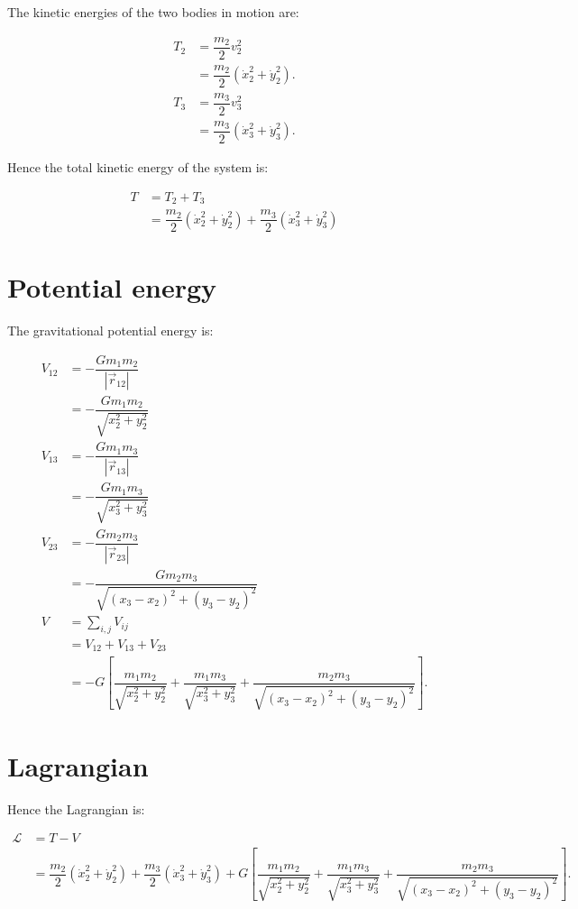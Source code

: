 \documentclass[12pt,a4paper,portrait]{article}
\begin{document}
	The kinetic energies of the two bodies in motion are:
	
	\begin{align*}
		T_2 &= \dfrac{m_2}{2} v_2^2 \\
		&= \dfrac{m_2}{2} \left(\dot{x}_2^2 + \dot{y}_2^2\right). \\
		T_3 &= \dfrac{m_3}{2}v_3^2 \\
		&= \dfrac{m_3}{2} \left(\dot{x}_3^2 + \dot{y}_3^2\right).
	\end{align*}
	
	Hence the total kinetic energy of the system is:
	
	\begin{align*}
		T &= T_2 + T_3 \\
		&= \dfrac{m_2}{2} \left(\dot{x}_2^2 + \dot{y}_2^2\right) + \dfrac{m_3}{2} \left(\dot{x}_3^2 + \dot{y}_3^2\right)
	\end{align*}
	
	\section{Potential energy}
	The gravitational potential energy is:
	
	\begin{align*}
		V_{12} &= -\dfrac{Gm_1m_2}{|\vec{r}_{12}|} \\
		&= -\dfrac{Gm_1m_2}{\sqrt{x_2^2+y_2^2}}\\
		V_{13} &= -\dfrac{Gm_1m_3}{|\vec{r}_{13}|} \\
		&= -\dfrac{Gm_1 m_3}{\sqrt{x_3^2+y_3^2}} \\
		V_{23} &= -\dfrac{Gm_2m_3}{|\vec{r}_{23}|} \\
		&= -\dfrac{Gm_2 m_3}{\sqrt{(x_3-x_2)^2+(y_3-y_2)^2}} \\
		V &= \sum_{i,j} V_{ij} \\
		&= V_{12}+V_{13} +V_{23} \\
		&= -G\left[\dfrac{m_1m_2}{\sqrt{x_2^2+y_2^2}} + \dfrac{m_1 m_3}{\sqrt{x_3^2+y_3^2}} + \dfrac{m_2 m_3}{\sqrt{(x_3-x_2)^2+(y_3-y_2)^2}}\right].
	\end{align*}
	
	\section{Lagrangian}
	Hence the Lagrangian is:
	
	\begin{align*}
		\mathcal{L} &= T - V \\
		&= \dfrac{m_2}{2} \left(\dot{x}_2^2 + \dot{y}_2^2\right) + \dfrac{m_3}{2} \left(\dot{x}_3^2 + \dot{y}_3^2\right) + G\left[\dfrac{m_1m_2}{\sqrt{x_2^2+y_2^2}} + \dfrac{m_1 m_3}{\sqrt{x_3^2+y_3^2}} + \dfrac{m_2 m_3}{\sqrt{(x_3-x_2)^2+(y_3-y_2)^2}}\right].\\
	\end{align*}
	
\end{document}
